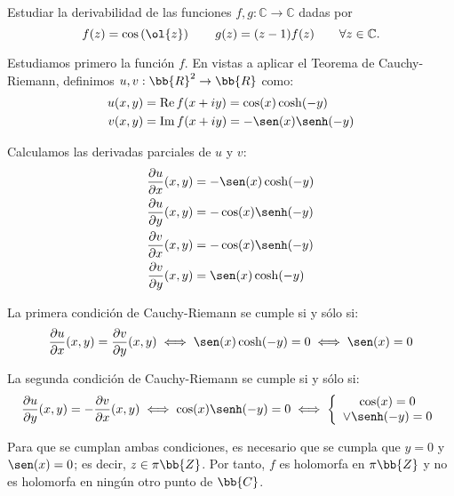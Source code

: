 \documentclass[12pt]{article}
\renewcommand{\Re}{\operatorname{Re}} %
\renewcommand{\Im}{\operatorname{Im}}
\begin{document}
    \begin{ejercicio}[3.5 puntos]
        Estudiar la derivabilidad de las funciones $f , g : \mathbb{C} \to \mathbb{C}$ dadas por
        \[
            f(z) = \cos\left(\ol{z}\right)\qquad g(z) = (z - 1) f(z)\qquad \forall z \in \mathbb{C}.
        \]

        Estudiamos primero la función $f$. En vistas a aplicar el Teorema de Cauchy-Riemann, definimos $u, v : \bb{R}^2 \to \bb{R}$ como:
        \begin{align*}
            u(x,y) &= \Re f(x+iy) = \cos(x)\cosh(-y) \\
            v(x,y) &= \Im f(x+iy) = -\sen(x)\senh(-y)
        \end{align*}

        Calculamos las derivadas parciales de $u$ y $v$:
        \begin{align*}
            \frac{\partial u}{\partial x}(x,y) &= -\sen(x)\cosh(-y) \\
            \frac{\partial u}{\partial y}(x,y) &= -\cos(x)\senh(-y) \\
            \frac{\partial v}{\partial x}(x,y) &= -\cos(x)\senh(-y) \\
            \frac{\partial v}{\partial y}(x,y) &= \sen(x)\cosh(-y)
        \end{align*}

        La primera condición de Cauchy-Riemann se cumple si y sólo si:
        \begin{align*}
            \frac{\partial u}{\partial x}(x,y) = \frac{\partial v}{\partial y}(x,y) \iff \sen(x)\cosh(-y) =  0 \iff \sen(x) = 0
        \end{align*}

        La segunda condición de Cauchy-Riemann se cumple si y sólo si:
        \begin{align*}
            \frac{\partial u}{\partial y}(x,y) = -\frac{\partial v}{\partial x}(x,y) \iff \cos(x)\senh(-y) = 0 \iff \left\{
            \begin{array}{c}
                \cos(x) = 0 \\
                \lor
                \senh(-y) = 0
            \end{array}
            \right.
        \end{align*}

        Para que se cumplan ambas condiciones, es necesario que se cumpla que $y=0$ y $\sen(x) = 0$; es decir, $z\in \pi\bb{Z}$. Por tanto, $f$ es holomorfa en $\pi\bb{Z}$ y no es holomorfa en ningún otro punto de $\bb{C}$.\\


\end{ejercicio}
\end{document}
